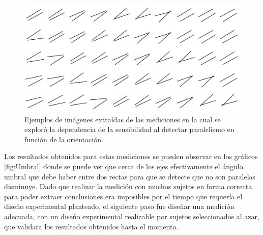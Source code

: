\documentclass{article}
\numberwithin{figure}{section}
\begin{document}
    \begin{figure}
        \center
        \includegraphics[width=\textwidth]{Imagenes/ImagenesDesarrollo2.png}
        \caption{Ejemplos de imágenes extraídas de las mediciones en la cual se exploró la dependencia de la sensibilidad al detectar paralelismo en función de la orientación.}
        \label{fig:ImagenesDesarrollo2}
    \end{figure}  
    
    Los resultados obtenidos para estas mediciones se pueden observar en los gráficos \ref{fig:Umbral} donde se puede ver que cerca de los ejes efectivamente el ángulo umbral que debe haber entre dos rectas para que se detecte que no son paralelas disminuye. Dado que realizar la medición con muchos sujetos en forma correcta para poder extraer conclusiones era imposibles por el tiempo que requería el diseño experimental planteado, el siguiente paso fue diseñar una medición adecuada, con un diseño experimental realizable por sujetos seleccionados al azar, que validara los resultados obtenidos hasta el momento.
    
\end{document}

